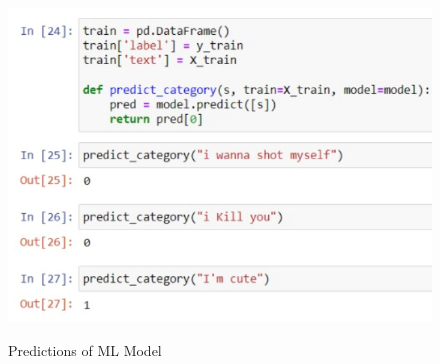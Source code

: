  \begin{figure}[htbp]
    \centering
     \includegraphics[width=0.8\linewidth]{C_chap/fig25.png}
\\\caption{Predictions of ML Model}
 \end{figure}


